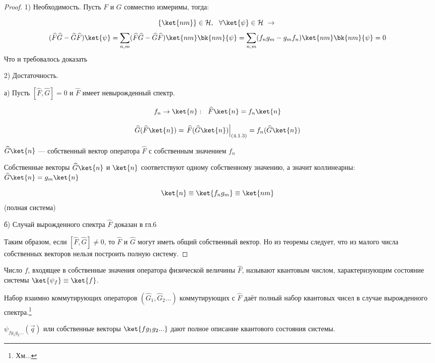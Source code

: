\begin{proof}
1) Необходимость. Пусть $F$ и $G$ совместно измеримы, тогда:

$$ \{\ket{nm}\} \in \mathcal{H},~~ \forall \ket{\psi} \in \mathcal{H} ~\rightarrow ~$$
$$(\widehat{F}\widehat{G} - \widehat{G}\widehat{F}) \ket{\psi} = \sum_{n,m} (\widehat{F}\widehat{G} - \widehat{G}\widehat{F}) \ket{nm}\bk{nm}{\psi} = \sum_{n,m} (f_n g_m - g_m f_n) \ket{nm}\bk{nm}{\psi} = 0$$
Что и требовалось доказать

2) Достаточность. 

а) Пусть $[\widehat{F}, \widehat{G}] = 0$ и $\widehat{F}$ имеет невырожденный спектр.

\begin{equation}
\label{eq:4_1_3}
f_n \rightarrow \ket{n}:~~ \widehat{F} \ket{n} = f_n \ket{n}
\end{equation}

$$\widehat{G}(\widehat{F} \ket{n}) = \left. \widehat{F}(\widehat{G}\ket{n}) \right|_{(4.1.3)} = f_n (\widehat{G}\ket{n})$$

$\widehat{G} \ket{n}$ --- собственный вектор оператора $\widehat{F}$ с собственным значением $f_n$

Собственные векторы $\widehat{G} \ket{n}$ и $\ket{n}$ соответствуют одному собственному значению, а значит коллинеарны: $\widehat{G} \ket{n} = g_m \ket{n}$

$$\ket{n} \equiv \ket{f_n g_m} \equiv \ket{nm}$$ (полная система)

б) Случай вырожденного спектра $\widehat{F}$ доказан в гл.6

Таким образом, если $[\widehat{F},\widehat{G}]\ne0$, то $\widehat{F}$ и $\widehat{G}$ могут иметь общий собственный вектор. Но из теоремы следует, что из малого числа собственных векторов нельзя построить полную систему.
\end{proof}

\begin{defn}
Число $f$, входящее в собственные значения оператора физической величины $\widehat{F}$, называют квантовым числом, характеризующим состояние системы $\ket{\psi_f}\equiv\ket{f}$.
\end{defn}

Набор взаимно коммутирующих операторов $(\widehat{G}_1, \widehat{G}_2...)$ коммутирующих с $\widehat{F}$ даёт полный набор квантовых чисел в случае вырожденного спектра.\footnote{Хм...}

$\psi_{f g_1 g_2 ...}(\vec{q})$ или собственные векторы $\ket{f g_1 g_2 ...}$ дают полное описание квантового состояния системы.

